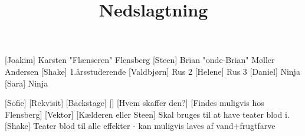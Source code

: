 \documentclass[a4paper,11pt]{article}
\title{Nedslagtning}
\begin{document}
\maketitle

\begin{roles}
[Joakim] Karsten "Flænseren" Flensberg
[Steen] Brian "onde-Brian" Møller Andersen
[Shake] 1.årsstuderende
[Valdbjørn] Rus 2
[Helene] Rus 3
[Daniel] Ninja
[Sara] Ninja
\end{roles}


\begin{props}
[Sofie]
[Rekvisit]
[Backstage]
[]
[Hvem skaffer den?]
[Findes muligvis hos Flensberg]
[Vektor]
[Kælderen eller Steen]
Skal bruges til at have teater blod i.
[Shake] Teater blod til alle effekter - kan muligvis laves af vand+frugtfarve
\end{props}
\end{document}
